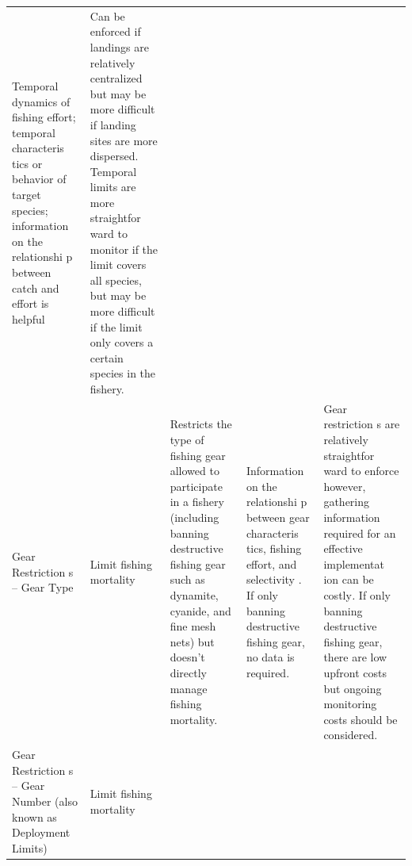 \documentclass[]{book}
\begin{document}
\begin{longtable}[]{@{}lllll@{}}
\begin{minipage}[t]{0.17\columnwidth}
Temporal dynamics of fishing effort; temporal characteris tics or
behavior of target species; information on the relationshi p between
catch and effort is helpful\strut
\end{minipage} & \begin{minipage}[t]{0.17\columnwidth}\raggedright\strut
Can be enforced if landings are relatively centralized but may be more
difficult if landing sites are more dispersed. Temporal limits are more
straightfor ward to monitor if the limit covers all species, but may be
more difficult if the limit only covers a certain species in the
fishery.\strut
\end{minipage}\tabularnewline
\begin{minipage}[t]{0.17\columnwidth}\raggedright\strut
Gear Restriction s -- Gear Type\strut
\end{minipage} & \begin{minipage}[t]{0.17\columnwidth}\raggedright\strut
Limit fishing mortality\strut
\end{minipage} & \begin{minipage}[t]{0.17\columnwidth}\raggedright\strut
Restricts the type of fishing gear allowed to participate in a fishery
(including banning destructive fishing gear such as dynamite, cyanide,
and fine mesh nets) but doesn't directly manage fishing mortality.\strut
\end{minipage} & \begin{minipage}[t]{0.17\columnwidth}\raggedright\strut
Information on the relationshi p between gear characteris tics, fishing
effort, and selectivity . If only banning destructive fishing gear, no
data is required.\strut
\end{minipage} & \begin{minipage}[t]{0.17\columnwidth}\raggedright\strut
Gear restriction s are relatively straightfor ward to enforce however,
gathering information required for an effective implementat ion can be
costly\emph{.} If only banning destructive fishing gear, there are low
upfront costs but ongoing monitoring costs should be considered.\strut
\end{minipage}\tabularnewline
\begin{minipage}[t]{0.17\columnwidth}\raggedright\strut
Gear Restriction s -- Gear Number (also known as Deployment
Limits)\strut
\end{minipage} & \begin{minipage}[t]{0.17\columnwidth}\raggedright\strut
Limit fishing mortality\strut
\end{minipage} & \begin{minipage}[t]{0.17\columnwidth}\raggedright\strut

\end{minipage}
\end{longtable}
\end{document}
